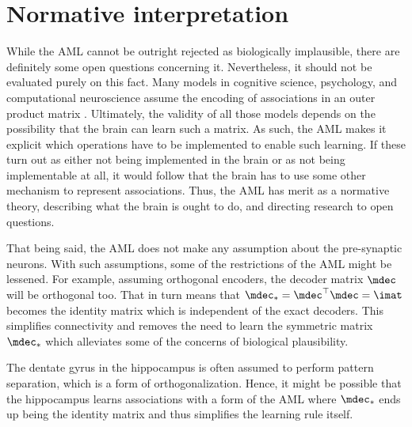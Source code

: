\section{Normative interpretation}
While the AML cannot be outright rejected as biologically implausible, there are definitely some open questions concerning it.
Nevertheless, it should not be evaluated purely on this fact.
Many models in cognitive science, psychology, and computational neuroscience assume the encoding of associations in an outer product matrix \parencite[e.g.,][]{kajic2017,nowak2001}.
Ultimately, the validity of all those models depends on the possibility that the brain can learn such a matrix.
As such, the AML makes it explicit which operations have to be implemented to enable such learning.
If these turn out as either not being implemented in the brain or as not being implementable at all, it would follow that the brain has to use some other mechanism to represent associations.
Thus, the AML has merit as a normative theory, describing what the brain is ought to do, and directing research to open questions.

That being said, the AML does not make any assumption about the pre-synaptic neurons.
With such assumptions, some of the restrictions of the AML might be lessened.
For example, assuming orthogonal encoders, the decoder matrix $\mdec$ will be orthogonal too.
That in turn means that $\mdec_* = \mdec\Tr \mdec = \imat$ becomes the identity matrix which is independent of the exact decoders.
This simplifies connectivity and removes the need to learn the symmetric matrix $\mdec_*$ which alleviates some of the concerns of biological plausibility.

The dentate gyrus in the hippocampus is often assumed to perform pattern separation, which is a form of orthogonalization.
Hence, it might be possible that the hippocampus learns associations with a form of the AML where $\mdec_*$ ends up being the identity matrix and thus simplifies the learning rule itself.


